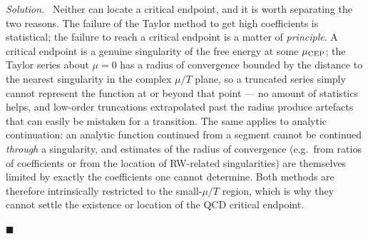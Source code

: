 \documentclass[11pt]{article}
\newenvironment{solution}{\par\smallskip\noindent\textit{Solution.}\ }{\hfill$\blacksquare$\par\smallskip}
\begin{document}
\begin{solution}
Neither can locate a critical endpoint, and it is worth separating the two reasons. The failure of the Taylor method to get high coefficients is statistical; the failure to reach a critical endpoint is a matter of \emph{principle}. A critical endpoint is a genuine singularity of the free energy at some $\mu_{\rm CEP}$; the Taylor series about $\mu=0$ has a radius of convergence bounded by the distance to the nearest singularity in the complex $\mu/T$ plane, so a truncated series simply cannot represent the function at or beyond that point --- no amount of statistics helps, and low-order truncations extrapolated past the radius produce artefacts that can easily be mistaken for a transition. The same applies to analytic continuation: an analytic function continued from a segment cannot be continued \emph{through} a singularity, and estimates of the radius of convergence (e.g.\ from ratios of coefficients or from the location of RW-related singularities) are themselves limited by exactly the coefficients one cannot determine. Both methods are therefore intrinsically restricted to the small-$\mu/T$ region, which is why they cannot settle the existence or location of the QCD critical endpoint.


\end{solution}
\end{document}
